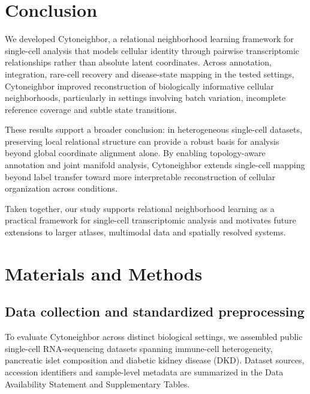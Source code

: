 \documentclass[11pt]{article}
\begin{document}
\section{Conclusion}

We developed Cytoneighbor, a relational neighborhood learning framework for single-cell analysis that models cellular identity through pairwise transcriptomic relationships rather than absolute latent coordinates. Across annotation, integration, rare-cell recovery and disease-state mapping in the tested settings, Cytoneighbor improved reconstruction of biologically informative cellular neighborhoods, particularly in settings involving batch variation, incomplete reference coverage and subtle state transitions.

These results support a broader conclusion: in heterogeneous single-cell datasets, preserving local relational structure can provide a robust basis for analysis beyond global coordinate alignment alone. By enabling topology-aware annotation and joint manifold analysis, Cytoneighbor extends single-cell mapping beyond label transfer toward more interpretable reconstruction of cellular organization across conditions.

Taken together, our study supports relational neighborhood learning as a practical framework for single-cell transcriptomic analysis and motivates future extensions to larger atlases, multimodal data and spatially resolved systems.



\section{Materials and Methods}

\subsection{Data collection and standardized preprocessing}

To evaluate Cytoneighbor across distinct biological settings, we assembled public single-cell RNA-sequencing datasets spanning immune-cell heterogeneity, pancreatic islet composition and diabetic kidney disease (DKD)\cite{Villani2017Immune,Muraro2016Pancreas,Baron2016Pancreas,Segerstolpe2016Pancreas,Xin2016Pancreas,Lawlor2017Pancreas,Wilson2022DKD,Chen2023DKDSpatial,Lake2023KidneyAtlas}. Dataset sources, accession identifiers and sample-level metadata are summarized in the Data Availability Statement and Supplementary Tables.
\end{document}
